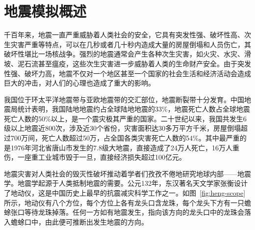 
\section{地震模拟概述}



千百年来，地震一直严重威胁着人类社会的安全，它具有突发性强、破坏性高、次生灾害严重等特点，可以在几秒或者几十秒内造成大量的房屋倒塌和人员伤亡，其破坏性堪比一场核战争。强烈的地震通常会产生各种次生灾害，如火灾、水灾、滑坡、泥石流甚至瘟疫，这些次生灾害进一步威胁着人类的生命财产安全。由于突发性强、破坏力高，地震不仅对一个地区甚至一个国家的社会生活和经济活动会造成巨大的冲击，对人们的心理也造成了重大的影响。

我国位于环太平洋地震带与亚欧地震带的交汇部位，地震断裂带十分发育。中国地震局统计表明，我国陆地地震约占全球陆地地震的33\%，地震死亡人数占全球地震死亡人数的50\%以上，是一个震灾极其严重的国家\cite{地震局}。二十世纪以来，我国共发生6级以上地震近800次，涉及近30个省份，灾害面积达30多万平方千米，房屋倒塌超过700万间，死亡人数超过50万，占全国各类灾害死亡人数的54\%。其中最严重的是1976年河北省唐山市发生的7.8级大地震，直接造成了24万人死亡，16万人重伤，一座重工业城市毁于一旦，直接经济损失超过100亿元\cite{地震局}。

地震灾害对人类社会的毁灭性破坏推动着学者们孜孜不倦地研究地球内部——地震学。地震学起源于人类抵制地震的需要。公元132年，东汉著名天文学家张衡设计了地动仪，这是中国历史上最早的抗震减灾科学工作之一\citep{stein2009introduction}。如图~\ref{fig:heng-scope}所示，地动仪有八个方位，每个方位上各有龙头口含龙珠，每个龙头下方有一只蟾蜍张口等待龙珠掉落。任何一方如有地震发生，指向该方向的龙头口中的龙珠会落入蟾蜍口中，由此便可推断出发生地震的方向\cite{seismoscopewiki}。

